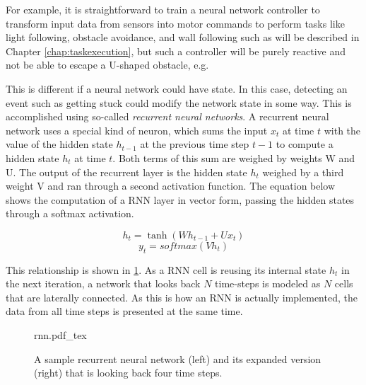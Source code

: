 For example, it is straightforward to train a neural network controller to transform input data from sensors into motor commands to perform tasks like light following, obstacle avoidance, and wall following such as will be described in Chapter \ref{chap:taskexecution}, but such a controller will be purely reactive and not be able to escape a U-shaped obstacle, e.g.

This is different if a neural network could have state. In this case, detecting an event such as getting stuck could modify the network state in some way. This is accomplished using so-called \textsl{recurrent neural networks}. A recurrent neural network uses a special kind of neuron, which sums the input $x_t$ at time $t$ with the value of the hidden state $h_{t-1}$ at the previous time step $t-1$ to compute a hidden state $h_t$ at time $t$. Both terms of this sum are weighed by weights W and U. The output of the recurrent layer is the hidden state $h_t$ weighed by a third weight V and ran through a second activation function. The equation below shows the computation of a RNN layer in vector form, passing the hidden states through a softmax activation.

\begin{equation}
h_t = \tanh(Wh_{t-1}+Ux_t)
\end{equation}
\begin{equation}
y_t = softmax(Vh_t)
\end{equation}

This relationship is shown in \cref{fig:rnn}. As a RNN cell is reusing its internal state $h_t$ in the next iteration, a network that looks back $N$ time-steps is modeled as $N$ cells that are laterally connected. As this is how an RNN is actually implemented, the data from all time steps is presented at the same time.

\begin{figure}[htb]
\tiny
    \centering
    \def\svgwidth{\textwidth}
    {rnn.pdf_tex}
    \caption{A sample recurrent neural network (left) and its expanded version (right) that is looking back four time steps. \label{fig:rnn}}
\end{figure}

